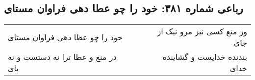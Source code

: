 \begin{center}
\section*{رباعی شماره ۳۸۱: خود را چو عطا دهی فراوان مستای}
\label{sec:sh381}
\begin{longtable}{l p{0.5cm} r}
خود را چو عطا دهی فراوان مستای
&&
وز منع کسی نیز مرو نیک از جای
\\
در منع و عطا ترا نه دستست و نه پای
&&
بندنده خدایست و گشاینده خدای
\\
\end{longtable}
\end{center}
